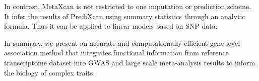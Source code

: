 \documentclass[10pt]{article}
\begin{document}
In contrast, MetaXcan is not restricted to one imputation or prediction scheme. It
infer the results of PrediXcan using summary statistics through an analytic formula. Thus it can be applied to linear models based on SNP data.

%
%
%

In summary, we present an accurate and computationally efficient gene-level association method that integrates functional information from reference transcriptome dataset into GWAS and large scale meta-analysis results to inform the biology of complex traits.
%
%
%


%
\end{document}

